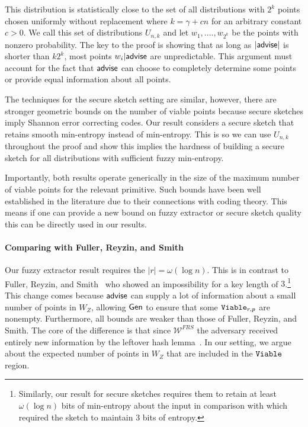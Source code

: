 This distribution is statistically close to the set of all distributions with $2^k$ points chosen uniformly without replacement where $k = \gamma +cn$ for an arbitrary constant $c>0$.  We call this set of distributions $U_{n,k}$ and let $w_1,...., w_{2^k}$ be the points with nonzero probability.  The key to the proof is showing that as long as $|{\mathsf{advise}}|$ is shorter than $k2^k$, most points $w_i | {\mathsf{advise}}$ are unpredictable.  This argument must account for the fact that ${\mathsf{advise}}$ can choose to completely determine some points or provide equal information about all points. 

The techniques for the secure sketch setting are similar, however, there are stronger geometric bounds on the number of viable points because secure sketches imply Shannon error correcting codes.  Our result considers a secure sketch that retains smooth min-entropy instead of min-entropy.  This is so we can use $U_{n,k}$ throughout the proof and show this implies the hardness of building a secure sketch for all distributions with sufficient fuzzy min-entropy.  

Importantly, both results operate generically in the size of the maximum number of viable points for the relevant primitive.  Such bounds have been well established in the literature due to their connections with coding theory.  This means if one can provide a new bound on fuzzy extractor or secure sketch quality this can be directly used in our results.


\paragraph{Comparing with Fuller, Reyzin, and Smith~\cite{fuller2020computational}}
Our fuzzy extractor result requires the $|r| = \omega(\log n)$.  This is in contrast to Fuller, Reyzin, and Smith~\cite{fuller2020computational} who showed an impossibility for a key length of $3$.\footnote{Similarly, our result for secure sketches requires them to retain at least $\omega(\log n)$ bits of min-entropy about the input in comparison with \cite{fuller2020computational} which required the sketch to maintain $3$ bits of entropy.} This change comes because ${\mathsf{advise}}$ can supply a lot of information about a small number of points in $W_Z$, allowing ${\mathsf{Gen}}$ to ensure that some $\mathtt{Viable}_{r,p}$ are nonempty. Furthermore, all bounds are weaker than those of Fuller, Reyzin, and Smith.  The core of the difference is that since $\mathcal{W}^{FRS}$ the adversary received entirely new information by the leftover hash lemma~\cite{haastad1993construction,barak2011leftover}. In our setting, we argue about the expected number of points in $W_Z$ that are included in the $\mathtt{Viable}$ region. 


